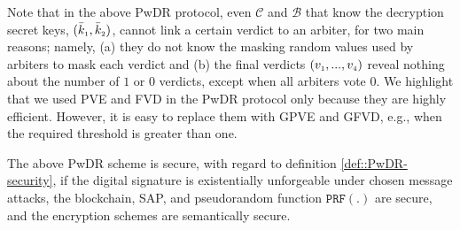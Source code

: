 %






Note that in the above PwDR protocol, even $\mathcal{C}$ and $\mathcal{B}$ that know the decryption secret keys, $(\bar k_{\scriptscriptstyle 1}, \bar k_{\scriptscriptstyle 2})$, cannot link a certain verdict to an arbiter, for two main reasons; namely,  (a) they do not know the masking random values used by arbiters to mask each verdict and (b) the final verdicts $(v_{\scriptscriptstyle 1},..., v_{\scriptscriptstyle 4})$ reveal nothing about the number of $1$ or $0$ verdicts, except when all arbiters vote $0$.  We highlight that we used PVE and FVD in the PwDR protocol only because they are highly efficient. However, it is easy to replace them with GPVE and GFVD, e.g., when the required threshold is greater than one. 



\begin{theorem}\label{theorem::PwDR-security}
The above PwDR scheme is secure, with regard to definition \ref{def::PwDR-security}, if the digital signature is existentially unforgeable under chosen message attacks,  the blockchain, SAP, and pseudorandom function $\mathtt{PRF}(.)$ are secure, and the encryption schemes are semantically secure. 
\end{theorem}




